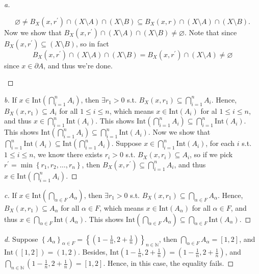\begin{proof}[a]
\begin{itemize}
    \[
      \varnothing \neq  B_X \left( x, r^{\prime}  \right) \cap (X \setminus A) \cap (X \setminus B) \subseteq B_X \left( x, r \right) \cap (X \setminus A) \cap (X \setminus B).
    \]  Now we show that \(B_X \left( x, r^{\prime}  \right) \cap (X \setminus A) \cap (X \setminus B) \neq \varnothing \). Note that since \(B_X \left( x, r^{\prime}  \right) \subseteq (X \setminus B) \), so in fact 
    \[
      B_X \left( x, r^{\prime}  \right) \cap \left( X \setminus A \right) \cap \left( X \setminus B \right) = B_X \left( x, r^{\prime}  \right)  \cap \left( X \setminus A \right)  \neq \varnothing 
    \] since \(x \in \partial A\), and thus we're done.  
  \end{itemize}         
\end{proof}
\begin{proof}[b]
  If \(x \in \mathrm{Int} \left( \bigcap_{i=1}^{n} A_i \right)  \), then \(\exists r_1 > 0\) s.t. \(B_X (x, r_1) \subseteq \bigcap_{i=1}^{n} A_i \). Hence, \(B_X(x, r_1) \subseteq A_i\) for all \(1 \le i \le n\), which means \(x \in \mathrm{Int}(A_i) \) for al \(1 \le i \le n\), and thus \(x \in \bigcap_{i=1}^{n} \mathrm{Int}(A_i)  \). This shows \(\mathrm{Int}\left( \bigcap_{i=1}^{n} A_i  \right) \subseteq \bigcap_{i=1}^{n} \mathrm{Int}(A_i) \). This shows \(\mathrm{Int}\left( \bigcap_{i=1}^{n} A_i  \right) \subseteq \bigcap_{i=1}^n \mathrm{Int}(A_i)    \). Now we show that \(\bigcap_{i=1}^{n} \mathrm{Int}(A_i) \subseteq \mathrm{Int}\left( \bigcap_{i=1}^{n} A_i  \right)    \). Suppose \(x \in \bigcap_{i=1}^{n} \mathrm{Int}(A_i)  \), for each \(i\) s.t. \(1 \le i \le n\), we know there exists \(r_i > 0\) s.t. \(B_X(x, r_i) \subseteq A_i\), so if we pick \(r^{\prime} = \min \left\{ r_1, r_2, \dots , r_n \right\} \), then \(B_X(x, r^{\prime} )\subseteq \bigcap_{i=1}^n A_i \), and thus \(x \in \mathrm{Int}\left( \bigcap_{i=1}^{n} A_i  \right) \).                 
\end{proof}
\begin{proof}[c]
  If \(x \in \mathrm{Int} \left( \bigcap_{\alpha \in F} A_\alpha  \right)  \), then \(\exists r_1 > 0\) s.t. \(B_X (x, r_1) \subseteq \bigcap_{\alpha \in F} A_\alpha  \). Hence, \(B_X(x, r_1) \subseteq A_\alpha \) for all \(\alpha \in F\), which means \(x \in \mathrm{Int}(A_\alpha ) \) for all \(\alpha \in F\), and thus \(x \in \bigcap_{\alpha \in F} \mathrm{Int}(A_\alpha )  \). This shows \(\mathrm{Int}\left( \bigcap_{\alpha \in F} A_\alpha   \right) \subseteq \bigcap_{\alpha \in F} \mathrm{Int}(A_\alpha ) \).
\end{proof}
\begin{proof}[d]
  Suppose \(\left\{ A_\alpha  \right\}_{\alpha \in F} = \left\{ \left( 1 - \frac{1}{n}, 2 + \frac{1}{n} \right)  \right\}_{n \in \mathbb{N} }  \), then \(\bigcap_{\alpha \in F} A_\alpha = [1, 2] \), and \(\mathrm{Int}\left( [1, 2] \right) = (1, 2)  \). Besides, \(\mathrm{Int} \left( 1 - \frac{1}{n}, 2 + \frac{1}{n} \right) = \left( 1 - \frac{1}{n}, 2 + \frac{1}{n} \right)   \), and \(\bigcap_{n \in \mathbb{N} } \left( 1 - \frac{1}{n}, 2 + \frac{1}{n} \right) = [1, 2]  \). Hence, in this case, the equality fails.      
\end{proof}
